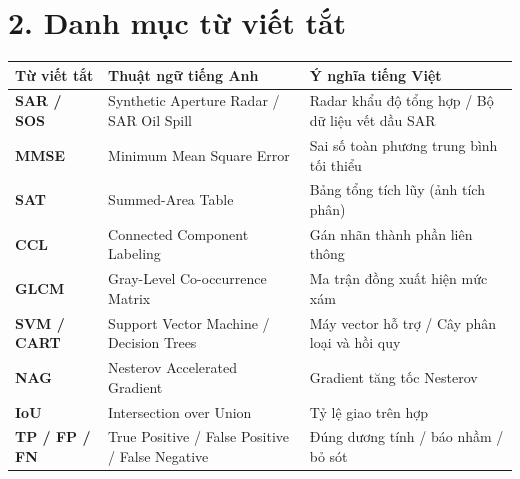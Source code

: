 \vspace{-0.2cm}


\section*{2. Danh mục từ viết tắt}

\begin{table}[!htbp]
\centering
\begin{tabularx}{\textwidth}{p{2.8cm}p{5.8cm}X}
\toprule
\textbf{Từ viết tắt} & \textbf{Thuật ngữ tiếng Anh} & \textbf{Ý nghĩa tiếng Việt} \\
\midrule
\textbf{SAR / SOS} & Synthetic Aperture Radar / SAR Oil Spill & Radar khẩu độ tổng hợp / Bộ dữ liệu vết dầu SAR \\
\textbf{MMSE} & Minimum Mean Square Error & Sai số toàn phương trung bình tối thiểu \\
\textbf{SAT} & Summed-Area Table & Bảng tổng tích lũy (ảnh tích phân) \\
\textbf{CCL} & Connected Component Labeling & Gán nhãn thành phần liên thông \\
\textbf{GLCM} & Gray-Level Co-occurrence Matrix & Ma trận đồng xuất hiện mức xám \\
\textbf{SVM / CART} & Support Vector Machine / Decision Trees & Máy vector hỗ trợ / Cây phân loại và hồi quy \\
\textbf{NAG} & Nesterov Accelerated Gradient & Gradient tăng tốc Nesterov \\
\textbf{IoU} & Intersection over Union & Tỷ lệ giao trên hợp \\
\textbf{TP / FP / FN} & True Positive / False Positive / False Negative & Đúng dương tính / báo nhầm / bỏ sót \\
\bottomrule
\end{tabularx}
\end{table}
\endgroup
